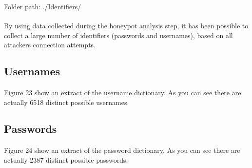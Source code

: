 Folder path: ./Identifiers/

\paragraph{}
By using data collected during the honeypot analysis step, it has been possible to
collect a large number of identifiers (passwords and usernames), based on all attackers
connection attempts.

\subsection{Usernames}

\paragraph{}
Figure 23 show an extract of the username dictionary. As you can see there are actually
6518 distinct possible usernames.


\subsection{Passwords}

\paragraph{}
Figure 24 show an extract of the password dictionary. As you can see there are actually
2387 distinct possible passwords.


